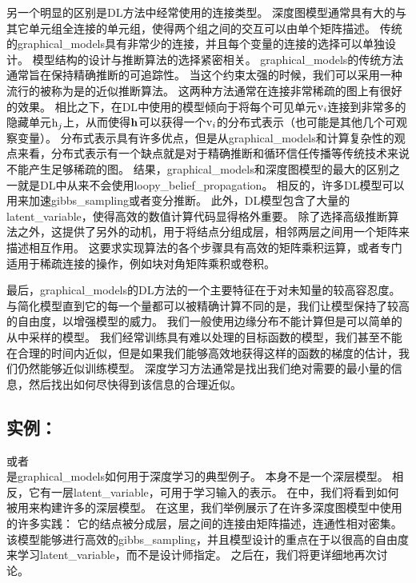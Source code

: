 另一个明显的区别是\gls{DL}方法中经常使用的连接类型。
深度图模型通常具有大的与其它单元组全连接的单元组，使得两个组之间的交互可以由单个矩阵描述。
传统的\gls{graphical_models}具有非常少的连接，并且每个变量的连接的选择可以单独设计。
模型结构的设计与推断算法的选择紧密相关。
\gls{graphical_models}的传统方法通常旨在保持精确推断的可追踪性。
当这个约束太强的时候，我们可以采用一种流行的被称为是的近似推断算法。
这两种方法通常在连接非常稀疏的图上有很好的效果。
相比之下，在\gls{DL}中使用的模型倾向于将每个可见单元$\mathrm{v}_i$连接到非常多的隐藏单元$\mathrm{h}_j$上，从而使得$\mathbf{h}$可以获得一个$\mathrm{v}_i$的分布式表示（也可能是其他几个可观察变量）。
分布式表示具有许多优点，但是从\gls{graphical_models}和计算复杂性的观点来看，分布式表示有一个缺点就是对于精确推断和循环信任传播等传统技术来说不能产生足够稀疏的图。
结果，\gls{graphical_models}和深度图模型的最大的区别之一就是\gls{DL}中从来不会使用\gls{loopy_belief_propagation}。
相反的，许多\gls{DL}模型可以用来加速\gls{gibbs_sampling}或者变分推断。
此外，\gls{DL}模型包含了大量的\gls{latent_variable}，使得高效的数值计算代码显得格外重要。
除了选择高级推断算法之外，这提供了另外的动机，用于将结点分组成层，相邻两层之间用一个矩阵来描述相互作用。
这要求实现算法的各个步骤具有高效的矩阵乘积运算，或者专门适用于稀疏连接的操作，例如块对角矩阵乘积或卷积。



最后，\gls{graphical_models}的\gls{DL}方法的一个主要特征在于对未知量的较高容忍度。
与简化模型直到它的每一个量都可以被精确计算不同的是，我们让模型保持了较高的自由度，以增强模型的威力。
我们一般使用边缘分布不能计算但是可以简单的从中采样的模型。
我们经常训练具有难以处理的目标函数的模型，我们甚至不能在合理的时间内近似，但是如果我们能够高效地获得这样的函数的梯度的估计，我们仍然能够近似训练模型。
深度学习方法通常是找出我们绝对需要的最小量的信息，然后找出如何尽快得到该信息的合理近似。



\subsection{实例：}
\label{sec:example_the_restricted_boltzmann_machine}
\citep{Smolensky86}或者\\ 是\gls{graphical_models}如何用于深度学习的典型例子。 
本身不是一个深层模型。 
相反，它有一层\gls{latent_variable}，可用于学习输入的表示。 
在中，我们将看到如何被用来构建许多的深层模型。
在这里，我们举例展示了在许多深度图模型中使用的许多实践：
它的结点被分成层，层之间的连接由矩阵描述，连通性相对密集。
该模型能够进行高效的\gls{gibbs_sampling}，并且模型设计的重点在于以很高的自由度来学习\gls{latent_variable}，而不是设计师指定。
之后在，我们将更详细地再次讨论。

